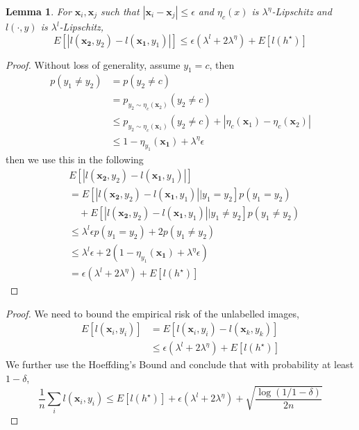 \documentclass{article}
\newtheorem{lemma}{Lemma}
\begin{document}
\begin{lemma}
For $\mathbf{x}_i, \mathbf{x}_j$ such that $|\mathbf{x}_i -\mathbf{x}_j|\leq \epsilon$ and $\eta_c(x)$ is $\lambda^\eta$-Lipschitz and $l(\cdot,y)$ is $\lambda^l$-Lipschitz,
\[
E[|l(\mathbf{x_2},y_2) -l(\mathbf{x_1},y_1)|] \leq  \epsilon(\lambda^l + 2 \lambda^{\eta}) + E[l(h^\star)]
\]
\end{lemma}
\begin{proof}
Without loss of generality, assume $y_1=c$, then 
\[
\begin{aligned}
p(y_1 \neq y_2)&=p(y_2 \neq c)\\
&= p_{y_2 \sim \eta_c(\mathbf{x}_2)}(y_2\neq c)
\\&\leq p_{y_2 \sim \eta_c(\mathbf{x}_1)}(y_2 \neq c) + |\eta_c(\mathbf{x}_1) - \eta_c(\mathbf{x}_2)|\\
&\leq 1 - \eta_{y_1}(\mathbf{x_1}) + \lambda^{\eta}\epsilon
\end{aligned}
\]
then we use this in the following
\[
\begin{aligned}
&E[|l(\mathbf{x_2},y_2) -l(\mathbf{x_1},y_1)|] \\ &= E[|l(\mathbf{x_2},y_2) -l(\mathbf{x_1},y_1)||y_1=y_2] p(y_1=y_2) \\ &\quad+ E[|l(\mathbf{x_2},y_2) -l(\mathbf{x_1},y_1)||y_1\neq y_2] p(y_1 \neq y_2) \\
&\leq \lambda^l \epsilon p(y_1=y_2) + 2 p(y_1 \neq y_2)\\
&\leq \lambda^l \epsilon + 2(1 - \eta_{y_1}(\mathbf{x_1}) + \lambda^{\eta}\epsilon) \\
&= \epsilon(\lambda^l + 2 \lambda^{\eta}) + E[l(h^\star)]
\end{aligned}
\]
\end{proof}

\begin{proof}
We need to bound the empirical risk of the unlabelled images,
\[
\begin{aligned}
E[ l(\mathbf{x}_i,y_i)] &= E[ l(\mathbf{x}_i,y_i) - l(\mathbf{x}_k,y_k) ] \\ 
&\leq \epsilon(\lambda^l + 2 \lambda^{\eta}) + E[l(h^\star)]
\end{aligned}
\]
We further use the Hoeffding's Bound and conclude that with probability at least $1 - \delta$,
\[
\frac{1}{n}\sum_i l(\mathbf{x}_i,y_i) \leq E[l(h^\star)] +\epsilon(\lambda^l + 2 \lambda^{\eta}) + 
\sqrt{\frac{\log(1/1-\delta)}{2n}}
\]
\end{proof}
\end{document}
